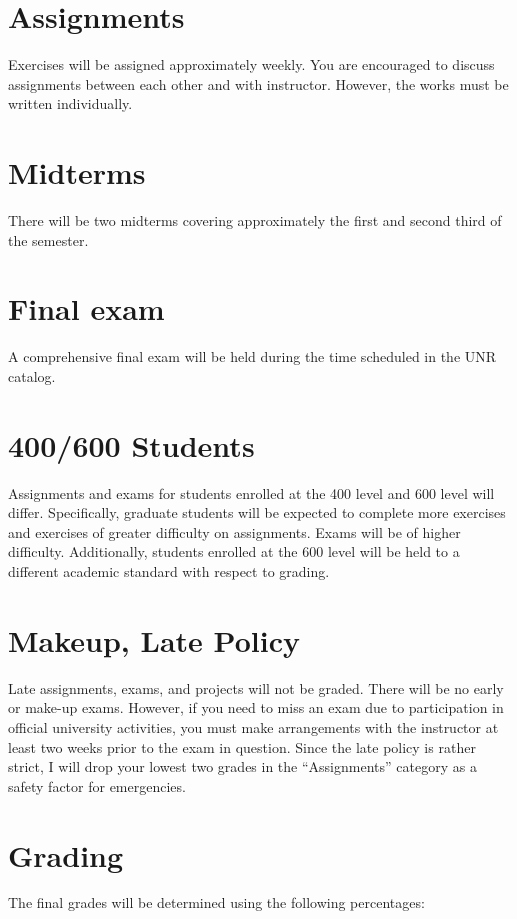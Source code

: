 \documentclass[11pt,onecolumn]{article}
\begin{document}
\section*{Assignments}
Exercises will be assigned approximately weekly. You are encouraged to discuss  assignments between each other and with instructor. However, the works must be written individually.

\section*{Midterms}
There will be two midterms covering approximately the first and second third of the semester.

\section*{Final exam}
A comprehensive final exam will be held during the time scheduled in the UNR catalog.

\section*{400/600 Students}
Assignments and exams for students enrolled at the 400 level and 600 level will differ. Specifically, graduate students will be expected to complete more exercises and exercises of greater difficulty on assignments. Exams will be of higher difficulty. Additionally, students enrolled at the 600 level will be held to a different academic standard with respect to grading.

\section*{Makeup, Late Policy}
Late assignments, exams, and projects will not be graded. There will be no early or make-up exams. However, if you need to miss an exam due to participation in official university activities, you must make arrangements with the instructor at least two weeks prior to the exam in question. Since the late policy is rather strict, I will drop your lowest two grades in the ``Assignments'' category as a safety factor for emergencies.

\section*{Grading}
The final grades will be determined using the following percentages:
\end{document}
